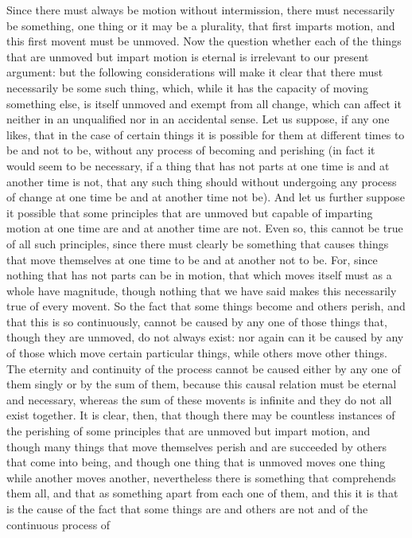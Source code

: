 Since there must always be motion without intermission, there must
necessarily be something, one thing or it may be a plurality, that
first imparts motion, and this first movent must be unmoved. Now the
question whether each of the things that are unmoved but impart motion
is eternal is irrelevant to our present argument: but the following
considerations will make it clear that there must necessarily be some
such thing, which, while it has the capacity of moving something else,
is itself unmoved and exempt from all change, which can affect it
neither in an unqualified nor in an accidental sense. Let us suppose,
if any one likes, that in the case of certain things it is possible
for them at different times to be and not to be, without any process
of becoming and perishing (in fact it would seem to be necessary,
if a thing that has not parts at one time is and at another time is
not, that any such thing should without undergoing any process of
change at one time be and at another time not be). And let us further
suppose it possible that some principles that are unmoved but capable
of imparting motion at one time are and at another time are not. Even
so, this cannot be true of all such principles, since there must clearly
be something that causes things that move themselves at one time to
be and at another not to be. For, since nothing that has not parts
can be in motion, that which moves itself must as a whole have magnitude,
though nothing that we have said makes this necessarily true of every
movent. So the fact that some things become and others perish, and
that this is so continuously, cannot be caused by any one of those
things that, though they are unmoved, do not always exist: nor again
can it be caused by any of those which move certain particular things,
while others move other things. The eternity and continuity of the
process cannot be caused either by any one of them singly or by the
sum of them, because this causal relation must be eternal and necessary,
whereas the sum of these movents is infinite and they do not all exist
together. It is clear, then, that though there may be countless instances
of the perishing of some principles that are unmoved but impart motion,
and though many things that move themselves perish and are succeeded
by others that come into being, and though one thing that is unmoved
moves one thing while another moves another, nevertheless there is
something that comprehends them all, and that as something apart from
each one of them, and this it is that is the cause of the fact that
some things are and others are not and of the continuous process of
